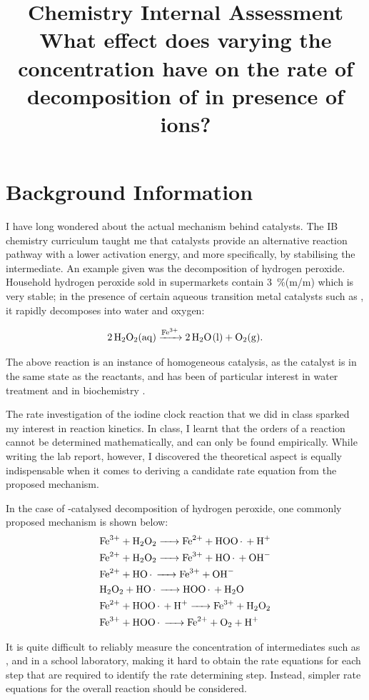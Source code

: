 \documentclass[a4paper, 12pt]{article}
\title{
\textbf{Chemistry Internal Assessment}\\
\bigskip
What effect does varying the concentration have on the rate of decomposition of \ce{H2O2} in presence of \ce{Fe^3+} ions?
}
\author{}
\date{}
\begin{document}
\maketitle

\section*{Background Information}
I have long wondered about the actual mechanism behind catalysts. The IB chemistry curriculum taught me that catalysts provide an alternative reaction pathway with a lower activation energy, and more specifically, by stabilising the intermediate. An example given was the decomposition of hydrogen peroxide. Household hydrogen peroxide sold in supermarkets contain \SI{3}{\%}(m/m)  which is very stable; in the presence of certain aqueous transition metal catalysts such as , it rapidly decomposes into water and oxygen:

\[ \ce{2 H2O2(aq) ->[Fe^3+] 2 H2O(l) + O2(g)}. \]

The above reaction is an instance of homogeneous catalysis, as the catalyst is in the same state as the reactants, and has been of particular interest in water treatment and in biochemistry \cite{de_laat}.

The rate investigation of the iodine clock reaction that we did in class sparked my interest in reaction kinetics. In class, I learnt that the orders of a reaction cannot be determined mathematically, and can only be found empirically. While writing the lab report, however, I discovered the theoretical aspect is equally indispensable when it comes to deriving a candidate rate equation from the proposed mechanism. 

In the case of -catalysed decomposition of hydrogen peroxide, one commonly proposed mechanism \cite{mechanism} is shown below:
\begin{align*}
    \ce{&Fe^3+ + H2O2 -> Fe^2+ + HOO. + H+}\\
    \ce{&Fe^2+ + H2O2 -> Fe^3+ + HO. + OH-}\\
    \ce{&Fe^2+ + HO.  -> Fe^3+ + OH-}\\
    \ce{&H2O2 + HO.   -> HOO. + H2O}\\
    \ce{&Fe^2+ + HOO. + H+ -> Fe^3+ + H2O2}\\
    \ce{&Fe^3+ + HOO. -> Fe^2+ + O2 + H+}
\end{align*}

It is quite difficult to reliably measure the concentration of intermediates such as ,  and  in a school laboratory, making it hard to obtain the rate equations for each step that are required to identify the rate determining step. Instead, simpler rate equations for the overall reaction should be considered.
\end{document}
